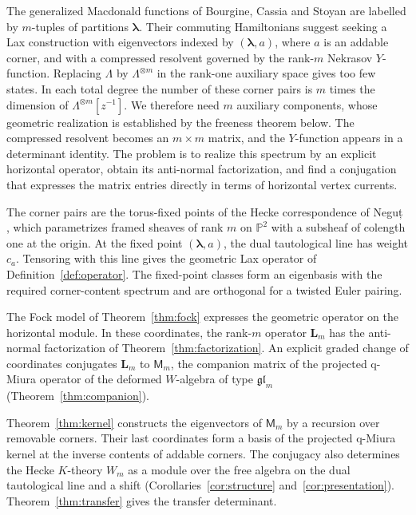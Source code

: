 \documentclass[11pt]{amsart}
\theoremstyle{definition}
\theoremstyle{remark}
\newcommand{\La}{\Lambda}                        %
\newcommand{\bl}{{\boldsymbol{\lambda}}}         %
\newcommand{\ceig}[1]{c_{#1}}                    %
\newcommand{\Ptwo}{\mathbb P^2}
\newcommand{\Wsp}[1]{W_{#1}}                     %
\newcommand{\LL}{\mathbf L}
\newcommand{\Lax}[1]{\LL_{#1}}                   %
\newcommand{\MM}{\mathsf M}
\newcommand{\Miura}[1]{\MM_{#1}}                 %
\newcommand{\Negut}{Neguț}
\begin{document}
The generalized Macdonald functions of Bourgine, Cassia and Stoyan \cite{BCS} are labelled by
\(m\)-tuples of partitions \(\bl\). Their commuting Hamiltonians suggest seeking a Lax
construction with eigenvectors indexed by \((\bl,a)\), where \(a\) is an addable corner, and
with a compressed resolvent governed by the rank-\(m\) Nekrasov \(Y\)-function.
Replacing \(\La\) by \(\La^{\otimes m}\) in the rank-one auxiliary space gives too few states.
In each total degree the number of these corner pairs is \(m\) times the dimension of
\(\La^{\otimes m}[z^{-1}]\). We therefore need \(m\) auxiliary components, whose geometric
realization is established by the freeness theorem below. The compressed resolvent becomes
an \(m\times m\) matrix, and the \(Y\)-function appears in a determinant identity.
The problem is to realize this spectrum by an explicit horizontal operator,
obtain its anti-normal factorization, and find a conjugation that expresses
the matrix entries directly in terms of horizontal vertex currents.

The corner pairs are the torus-fixed points of the Hecke correspondence of
\Negut{} \cite{N1,N2}, which parametrizes framed sheaves of rank \(m\) on
\(\Ptwo\) with a subsheaf of colength one at the origin.
At the fixed point \((\bl,a)\), the dual tautological line has weight \(\ceig{a}\).
Tensoring with this line gives the geometric Lax operator of
Definition~\ref{def:operator}. The fixed-point classes form an eigenbasis with
the required corner-content spectrum and are orthogonal for a twisted Euler pairing.

The Fock model of Theorem~\ref{thm:fock} expresses the geometric operator on
the horizontal module. In these coordinates, the rank-\(m\) operator \(\Lax{m}\)
has the anti-normal factorization of Theorem~\ref{thm:factorization}.
An explicit graded change of coordinates conjugates \(\Lax{m}\) to \(\Miura{m}\), the companion
matrix of the projected q-Miura operator of the deformed \(W\)-algebra of type
\(\mathfrak{gl}_m\) (Theorem~\ref{thm:companion}).

Theorem~\ref{thm:kernel} constructs the eigenvectors of \(\Miura{m}\) by a recursion
over removable corners. Their last coordinates form a basis of the projected
q-Miura kernel at the inverse contents of addable corners. The conjugacy also
determines the Hecke \(K\)-theory \(\Wsp{m}\) as a module over the free algebra
on the dual tautological line and a shift
(Corollaries~\ref{cor:structure} and~\ref{cor:presentation}).
Theorem~\ref{thm:transfer} gives the transfer determinant.
\end{document}
